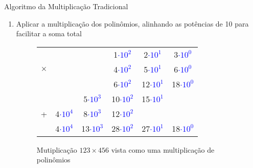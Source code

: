 \documentclass{beamer}
\newcounter{saveenumi}
\newcommand{\seti}{\setcounter{saveenumi}{\value{enumi}}}
\newcommand{\conti}{\setcounter{enumi}{\value{saveenumi}}}
\begin{document}
\begin{frame}{Algoritmo da Multiplicação Tradicional}
	\begin{enumerate}
		\conti
		\item Aplicar a multiplicação dos polinômios, alinhando as potências de 10 para facilitar a soma total

		\begin{figure}[H]
			\bgroup
			\def\arraystretch{1.2}%
			\begin{table}[H]
				\centering
				\begin{tabular}{cccccc}\label{mult}

				  	         & & & 1\textcolor{blue}{$\cdot 10^2$} & 2\textcolor{blue}{$\cdot 10^1$} & 3\textcolor{blue}{$\cdot 10^0$}    \\
					$\times$ & & & 4\textcolor{blue}{$\cdot 10^2$} & 5\textcolor{blue}{$\cdot 10^1$} & 6\textcolor{blue}{$\cdot 10^0$}    \\
					\hline
				  	         & & & 6\textcolor{blue}{$\cdot 10^2$} & 12\textcolor{blue}{$\cdot 10^1$} & 18\textcolor{blue}{$\cdot 10^0$}    \\
				  	           & & 5\textcolor{blue}{$\cdot 10^3$} & 10\textcolor{blue}{$\cdot 10^2$} & 15\textcolor{blue}{$\cdot 10^1$} &  \\
				  	+            &   4\textcolor{blue}{$\cdot 10^4$} & 8\textcolor{blue}{$\cdot 10^3$} & 12\textcolor{blue}{$\cdot 10^2$} && \\
					\hline
						     & 4\textcolor{blue}{$\cdot 10^4$} & 13\textcolor{blue}{$\cdot 10^3$} &28\textcolor{blue}{$\cdot 10^2$} &27\textcolor{blue}{$\cdot 10^1$}&18\textcolor{blue}{$\cdot 10^0$}\\
				\end{tabular}
				
			\end{table}
			\egroup
			\caption{Mutiplicação $123\times456$ vista como uma multiplicação de polinômios}
			\label{fig:mul}
		\end{figure}
		\seti
	\end{enumerate}
\end{frame}
\end{document}
